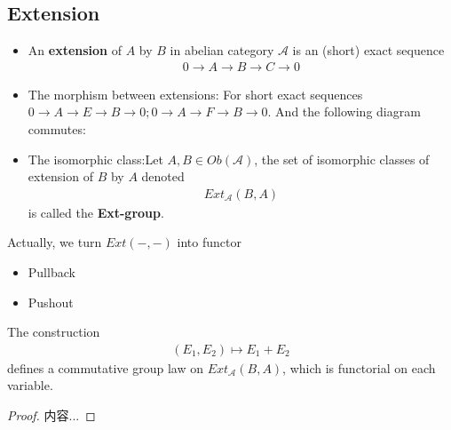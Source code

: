 \documentclass[Total.tex]{subfiles}
\begin{document}
				\subsection{Extension}
					\begin{Def}
						\begin{itemize}
							\item An \textbf{extension} of $A$ by $B$ in abelian category $\mathcal{A}$ is an (short) exact sequence
							\begin{gather*}
								0\rightarrow A\rightarrow B\rightarrow C\rightarrow 0
							\end{gather*}
							\item The morphism between extensions: For short exact sequences $0\rightarrow A\rightarrow E\rightarrow B\rightarrow 0;0\rightarrow A\rightarrow F\rightarrow B\rightarrow 0$. And the following diagram commutes:
							\begin{center}
							\end{center}
							\item The isomorphic class:Let $A,B\in Ob(\mathcal{A})$, the set of isomorphic classes of extension of $B$ by $A$ denoted
							\begin{gather*}
								Ext_\mathcal{A}(B,A)
							\end{gather*}
							is called the \textbf{Ext-group}.
						\end{itemize}
					\end{Def}
					
					Actually, we turn $Ext(-,-)$ into functor
					\begin{itemize}
						\item Pullback
						\item Pushout
					\end{itemize}
					
					
					
					\begin{lemma}
						The construction
						\begin{gather*}
							(E_1,E_2)\mapsto E_1+E_2
						\end{gather*}
						defines a commutative group law on $Ext_\mathcal{A}(B,A)$, which is functorial on each variable.
					\end{lemma}
					\begin{proof}
						内容...
					\end{proof}
					
\end{document}
